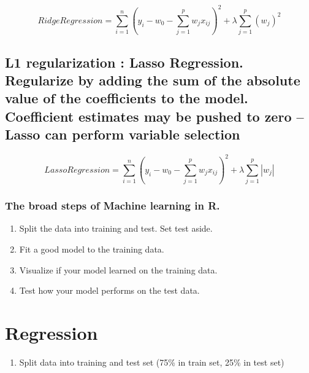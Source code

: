 \documentclass[11pt,]{article}
\providecommand{\tightlist}{%
  \setlength{\itemsep}{0pt}\setlength{\parskip}{0pt}}
\begin{document}
\[Ridge Regression=\sum_{i=1}^{n}(y_i - w_0 - \sum_{j=1}^{p}w_jx_{ij})^2 + \lambda\sum_{j=1}^p(w_j)^2\]

\hypertarget{l1-regularization-lasso-regression.-regularize-by-adding-the-sum-of-the-absolute-value-of-the-coefficients-to-the-model.-coefficient-estimates-may-be-pushed-to-zero-lasso-can-perform-variable-selection}{%
\subsection{L1 regularization : Lasso Regression. Regularize by adding
the sum of the absolute value of the coefficients to the model.
Coefficient estimates may be pushed to zero -- Lasso can perform
variable
selection}\label{l1-regularization-lasso-regression.-regularize-by-adding-the-sum-of-the-absolute-value-of-the-coefficients-to-the-model.-coefficient-estimates-may-be-pushed-to-zero-lasso-can-perform-variable-selection}}

\[Lasso Regression=\sum_{i=1}^{n}(y_i - w_0 - \sum_{j=1}^{p}w_jx_{ij})^2 + \lambda\sum_{j=1}^p|w_j|\]

\newpage

\hypertarget{the-broad-steps-of-machine-learning-in-r.}{%
\subsubsection{The broad steps of Machine learning in
R.}\label{the-broad-steps-of-machine-learning-in-r.}}

\begin{enumerate}
\def\labelenumi{\arabic{enumi}.}
\item
  Split the data into training and test. Set test aside.
\item
  Fit a good model to the training data.
\item
  Visualize if your model learned on the training data.
\item
  Test how your model performs on the test data.
\end{enumerate}

\hypertarget{regression}{%
\section{Regression}\label{regression}}

\begin{enumerate}
\def\labelenumi{\arabic{enumi}.}
\tightlist
\item
  Split data into training and test set (75\% in train set, 25\% in test
  set)
\end{enumerate}
\end{document}
